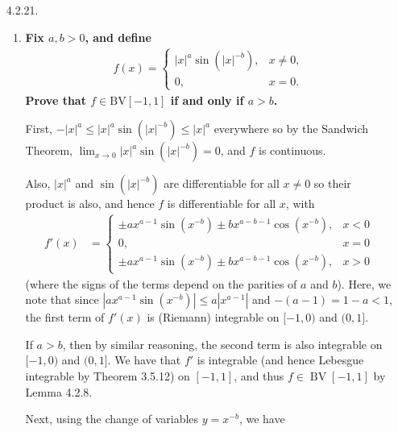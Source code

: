 \documentclass[a4paper,12pt]{article}
\DeclareMathOperator*{\BV}{BV}
\begin{document}
\begin{enumerate}
    \item[4.2.21.]
        \begin{enumerate}
            \item
            \boldmath\textbf{Fix $a, b > 0$, and define
                \begin{align*}
                    f(x) = \begin{cases}
                        |x|^a \sin(|x|^{-b}), &x \neq 0, \\
                        0, &x = 0.
                    \end{cases}
                \end{align*}
                Prove that $f \in \text{BV}[-1, 1]$ if and only if $a > b$.
            }\unboldmath \par
            First, $-|x|^a \leq |x|^a \sin(|x|^{-b}) \leq |x|^a$ everywhere so by the Sandwich Theorem, $\lim_{x \to 0} |x|^a \sin(|x|^{-b}) = 0$, and $f$ is continuous. \par
            Also, $|x|^a$ and $\sin(|x|^{-b})$ are differentiable for all $x \neq 0$ so their product is also, and hence $f$ is differentiable for all $x$, with
            \begin{align*}
                f'(x) %
                &= \begin{cases}
                    \pm ax^{a - 1} \sin(x^{-b}) \pm bx^{a - b - 1} \cos(x^{-b}), &x < 0 \\
                    0, &x = 0 \\
                    \pm ax^{a - 1} \sin(x^{-b}) \pm bx^{a - b - 1} \cos(x^{-b}), &x > 0
                \end{cases}
            \end{align*}
            (where the signs of the terms depend on the parities of $a$ and $b$). Here, we note that since $|ax^{a - 1} \sin(x^{-b})| \leq a|x^{a - 1}|$ and $-(a - 1) = 1 - a < 1$, the first term of $f'(x)$ is (Riemann) integrable on $[-1, 0)$ and $(0, 1]$. \par
            If $a > b$, then by similar reasoning, the second term is also integrable on $[-1, 0)$ and $(0, 1]$. We have that $f'$ is integrable (and hence Lebesgue integrable by Theorem 3.5.12) on $[-1, 1]$, and thus $f \in \BV[-1, 1]$ by Lemma 4.2.8. \par
            Next, using the change of variables $y = x^{-b}$, we have
            \begin{align} \label{eq:intf}

\end{align}
\end{enumerate}
\end{enumerate}
\end{document}
